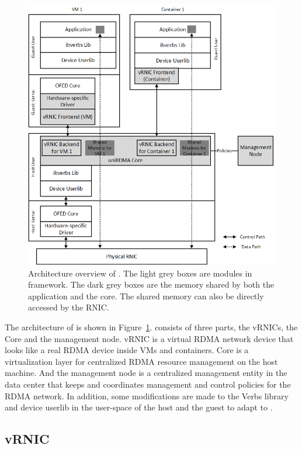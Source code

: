 \begin{figure}[!ht]
	\centering
	\includegraphics[width=1\linewidth]{images/framework-overview.png}
	\caption{Architecture overview of \sys. The light grey boxes are modules in \sys framework. The dark grey boxes are the memory shared by both the application and the \sys core. The shared memory can also be directly accessed by the RNIC.}
	\label{fig:framework-overview}
\end{figure}

The architecture of \sys is shown in Figure~\ref{fig:framework-overview}.
\sys consists of three parts, the vRNICs, the \sys Core and the management node. vRNIC is a virtual RDMA network device that looks like a real RDMA device inside VMs and containers. \sys Core is a virtualization layer for centralized RDMA resource management on the host machine. And the management node is a centralized management entity in the data center that keeps and coordinates management and control policies for the RDMA network.
In addition, some modifications are made to the Verbs library and device userlib in the user-space of the host and the guest to adapt to \sys.

\subsection{vRNIC}

